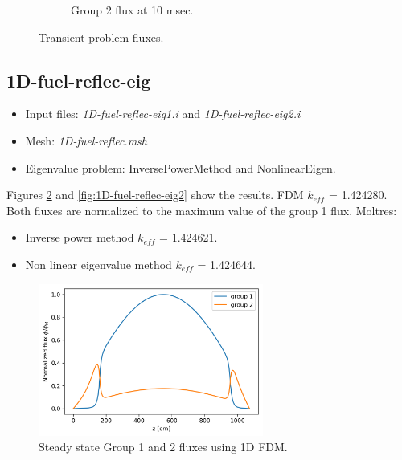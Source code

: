 \documentclass[11pt,letterpaper]{article}
\begin{document}
\begin{figure}[htbp!]
\begin{subfigure}[t]{0.4\textwidth}
			\caption{Group 2 flux at 10 msec.}
		\end{subfigure}
		\hfill
		\caption{Transient problem fluxes.}
		\label{fig:1D-fuel-reflec}
	\end{figure}

\subsection{1D-fuel-reflec-eig}

	\begin{itemize}
		\item Input files: \textit{1D-fuel-reflec-eig1.i} and \textit{1D-fuel-reflec-eig2.i}
		\item Mesh: \textit{1D-fuel-reflec.msh}
		\item Eigenvalue problem: InversePowerMethod and NonlinearEigen.
	\end{itemize}

Figures \ref{fig:1D-fuel-reflec-eig1} and \ref{fig:1D-fuel-reflec-eig2} show the results.
FDM $k_{eff}$ = 1.424280. Both fluxes are normalized to the maximum value of the group 1 flux.
Moltres: 
\begin{itemize}
	\item Inverse power method $k_{eff}$ = 1.424621.
	\item Non linear eigenvalue method $k_{eff}$ = 1.424644.
\end{itemize}

	\begin{figure}[htbp!]
		\centering
		\includegraphics[height=5cm]{1D-fuel-reflec-eig-FDM}
		\caption{Steady state Group 1 and 2 fluxes using 1D FDM.}
		\label{fig:1D-fuel-reflec-eig1}
	\end{figure}
\end{document}
